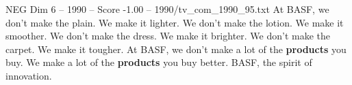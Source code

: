 \begin{textsample}{NEG Dim 6 – 1990 – Score -1.00 – 1990/tv\_com\_1990\_95.txt}  \label{ex:f6_neg_027}
At BASF, we don't make the plain.
We make it lighter.
We don't make the lotion.
We make it smoother.
We don't make the dress.
We make it brighter.
We don't make the carpet.
We make it tougher.
At BASF, we don't make a lot of the \textbf{products} you buy.
We make a lot of the \textbf{products} you buy better.
BASF, the spirit of innovation.

\end{textsample}
